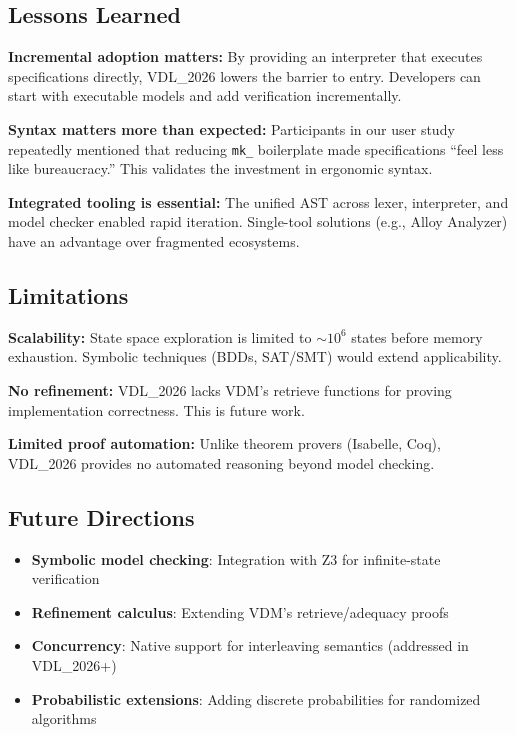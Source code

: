 \documentclass[conference]{IEEEtran}
\begin{document}
\subsection{Lessons Learned}

\textbf{Incremental adoption matters:} By providing an interpreter that executes specifications directly, VDL\_2026 lowers the barrier to entry. Developers can start with executable models and add verification incrementally.

\textbf{Syntax matters more than expected:} Participants in our user study repeatedly mentioned that reducing \texttt{mk\_} boilerplate made specifications ``feel less like bureaucracy.'' This validates the investment in ergonomic syntax.

\textbf{Integrated tooling is essential:} The unified AST across lexer, interpreter, and model checker enabled rapid iteration. Single-tool solutions (e.g., Alloy Analyzer) have an advantage over fragmented ecosystems.

\subsection{Limitations}

\textbf{Scalability:} State space exploration is limited to $\sim10^6$ states before memory exhaustion. Symbolic techniques (BDDs, SAT/SMT) would extend applicability.

\textbf{No refinement:} VDL\_2026 lacks VDM's retrieve functions for proving implementation correctness. This is future work.

\textbf{Limited proof automation:} Unlike theorem provers (Isabelle, Coq), VDL\_2026 provides no automated reasoning beyond model checking.

\subsection{Future Directions}

\begin{itemize}
\item \textbf{Symbolic model checking}: Integration with Z3 for infinite-state verification
\item \textbf{Refinement calculus}: Extending VDM's retrieve/adequacy proofs
\item \textbf{Concurrency}: Native support for interleaving semantics (addressed in VDL\_2026+)
\item \textbf{Probabilistic extensions}: Adding discrete probabilities for randomized algorithms
\end{itemize}
\end{document}
